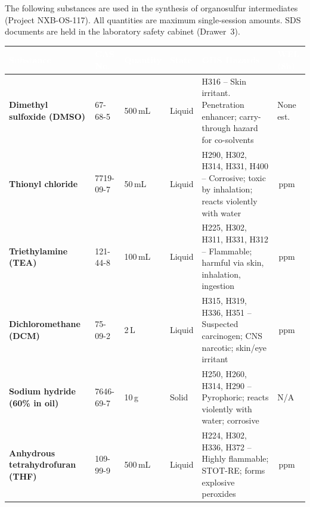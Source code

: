 

\vspace{4pt}

The following substances are used in the synthesis of organosulfur intermediates
(Project NXB-OS-117). All quantities are maximum single-session amounts.
SDS documents are held in the laboratory safety cabinet (Drawer~3).

\vspace{6pt}

\noindent
\begin{tabularx}{\linewidth}{@{}
  >{\bfseries\small}p{3.2cm}
  >{\small}p{2.0cm}
  >{\small}p{1.7cm}
  >{\small\centering}p{1.4cm}
  >{\small}X
  >{\small\centering\arraybackslash}p{1.6cm}
  @{}}
\toprule
\rowcolor{NavyDeep}
\textcolor{white}{\textbf{Substance}} &
\textcolor{white}{\textbf{CAS No.}} &
\textcolor{white}{\textbf{Quantity}} &
\textcolor{white}{\textbf{State}} &
\textcolor{white}{\textbf{GHS Hazards}} &
\textcolor{white}{\textbf{WEL (8h)}} \\
\midrule
\rowcolor{LightFog}
Dimethyl sulfoxide (DMSO) &
67-68-5 &
500\,mL &
Liquid &
H316 -- Skin irritant. Penetration enhancer; carry-through hazard for co-solvents &
None est. \\
\rowcolor{white}
Thionyl chloride &
7719-09-7 &
50\,mL &
Liquid &
H290, H302, H314, H331, H400 -- Corrosive; toxic by inhalation; reacts violently with water &
1\,ppm \\
\rowcolor{LightFog}
Triethylamine (TEA) &
121-44-8 &
100\,mL &
Liquid &
H225, H302, H311, H331, H312 -- Flammable; harmful via skin, inhalation, ingestion &
1\,ppm \\
\rowcolor{white}
Dichloromethane (DCM) &
75-09-2 &
2\,L &
Liquid &
H315, H319, H336, H351 -- Suspected carcinogen; CNS narcotic; skin/eye irritant &
100\,ppm \\
\rowcolor{LightFog}
Sodium hydride (60\% in oil) &
7646-69-7 &
10\,g &
Solid &
H250, H260, H314, H290 -- Pyrophoric; reacts violently with water; corrosive &
N/A \\
\rowcolor{white}
Anhydrous tetrahydrofuran (THF) &
109-99-9 &
500\,mL &
Liquid &
H224, H302, H336, H372 -- Highly flammable; STOT-RE; forms explosive peroxides &
50\,ppm \\
\bottomrule
\end{tabularx}

